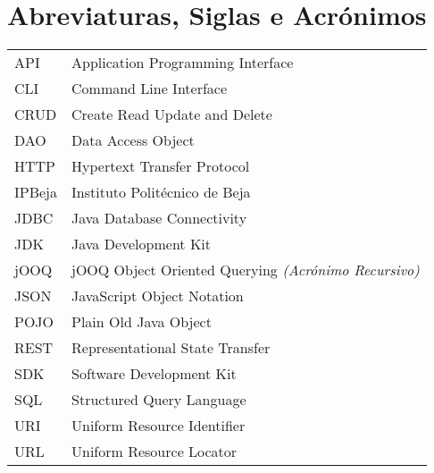 \chapter{Abreviaturas, Siglas e Acrónimos}

\begin{longtable}{p{} p{}} 

API & Application Programming Interface\\
CLI & Command Line Interface\\
CRUD & Create Read Update and Delete\\
DAO & Data Access Object\\
HTTP & Hypertext Transfer Protocol\\
IPBeja & Instituto Politécnico de Beja\\
JDBC & Java Database Connectivity\\
JDK & Java Development Kit\\
jOOQ & jOOQ Object Oriented Querying \textit{(Acrónimo Recursivo)}\\
JSON & JavaScript Object Notation\\
POJO & Plain Old Java Object\\
REST & Representational State Transfer\\
SDK & Software Development Kit\\
SQL & Structured Query Language\\
URI & Uniform Resource Identifier\\
URL & Uniform Resource Locator

\end{longtable}
